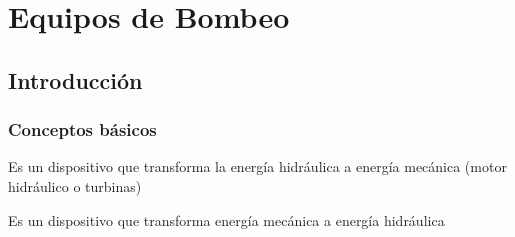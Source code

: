 \chapter{Equipos de Bombeo}

\section{Introducción}
\subsection{Conceptos básicos}
\begin{definition}
    Es un dispositivo que transforma la energía hidráulica a energía mecánica (motor hidráulico o turbinas)
\end{definition}
\begin{definition}[Bomba]
    Es un dispositivo que transforma energía mecánica a energía hidráulica
\end{definition}

